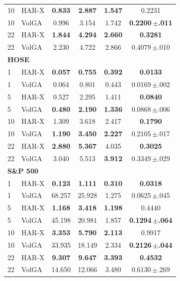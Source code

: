 \begin{tabular}{llcccc}
10 & HAR-X & \textbf{0.833} & \textbf{2.887} & \textbf{1.547} & 0.2231 \\
10 & VolGA & 0.996 & 3.154 & 1.742 & \textbf{0.2200\,$\pm$.011} \\
22 & HAR-X & \textbf{1.844} & \textbf{4.294} & \textbf{2.660} & \textbf{0.3281} \\
22 & VolGA & 2.230 & 4.722 & 2.866 & 0.4079\,$\pm$.010 \\
\midrule
\multicolumn{6}{l}{\textbf{HOSE}} \\
1 & HAR-X & \textbf{0.057} & \textbf{0.755} & \textbf{0.392} & \textbf{0.0133} \\
1 & VolGA & 0.064 & 0.801 & 0.443 & 0.0169\,$\pm$.002 \\
5 & HAR-X & 0.527 & 2.295 & 1.411 & \textbf{0.0840} \\
5 & VolGA & \textbf{0.480} & \textbf{2.190} & \textbf{1.336} & 0.0868\,$\pm$.006 \\
10 & HAR-X & 1.309 & 3.618 & 2.417 & \textbf{0.1790} \\
10 & VolGA & \textbf{1.190} & \textbf{3.450} & \textbf{2.227} & 0.2105\,$\pm$.017 \\
22 & HAR-X & \textbf{2.880} & \textbf{5.367} & 4.035 & \textbf{0.3025} \\
22 & VolGA & 3.040 & 5.513 & \textbf{3.912} & 0.3349\,$\pm$.029 \\
\midrule
\multicolumn{6}{l}{\textbf{S\&P 500}} \\
1 & HAR-X & \textbf{0.123} & \textbf{1.111} & \textbf{0.310} & \textbf{0.0318} \\
1 & VolGA & 68.257 & 25.928 & 1.275 & 0.0625\,$\pm$.045 \\
5 & HAR-X & \textbf{1.168} & \textbf{3.418} & \textbf{1.198} & 0.4440 \\
5 & VolGA & 45.198 & 20.981 & 1.857 & \textbf{0.1294\,$\pm$.064} \\
10 & HAR-X & \textbf{3.353} & \textbf{5.790} & \textbf{2.113} & 0.9917 \\
10 & VolGA & 33.935 & 18.149 & 2.334 & \textbf{0.2126\,$\pm$.044} \\
22 & HAR-X & \textbf{9.307} & \textbf{9.647} & \textbf{3.393} & \textbf{0.4532} \\
22 & VolGA & 14.650 & 12.066 & 3.480 & 0.6130\,$\pm$.269 \\
\bottomrule
\end{tabular}

